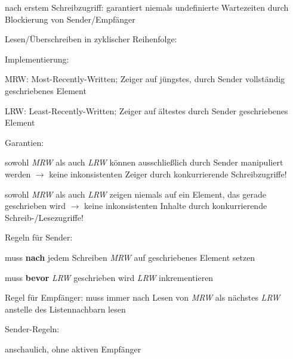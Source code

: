 \documentclass[a4paper]{article}
\begin{document}
\begin{multicols}{3}
    \begin{itemize*}
        \item
        nach erstem Schreibzugriff: garantiert niemals undefinierte
        Wartezeiten durch Blockierung von Sender/Empfänger
        \item
        Lesen/Überschreiben in zyklischer Reihenfolge:
        \item
        Implementierung:
        \begin{itemize*}
            \item MRW: Most-Recently-Written; Zeiger auf jüngstes, durch Sender vollständig geschriebenes Element
            \item LRW: Least-Recently-Written; Zeiger auf ältestes durch Sender geschriebenes Element
            \item Garantien: \begin{itemize*} \item   sowohl \emph{MRW} als auch \emph{LRW} können ausschließlich durch   Sender manipuliert werden $\rightarrow$  keine   inkonsistenten Zeiger durch konkurrierende Schreibzugriffe! \item   sowohl \emph{MRW} als auch \emph{LRW} zeigen niemals auf ein   Element, das gerade geschrieben wird $\rightarrow$    keine inkonsistenten Inhalte durch konkurrierende   Schreib-/Lesezugriffe! \end{itemize*}
            \item Regeln für Sender: \begin{itemize*} \item   muss \textbf{nach} jedem Schreiben \emph{MRW} auf geschriebenes   Element setzen \item   muss \textbf{bevor} \emph{LRW} geschrieben wird \emph{LRW}   inkrementieren \end{itemize*}
            \item Regel für Empfänger: muss immer nach Lesen von \emph{MRW} als nächstes \emph{LRW} anstelle des Listennachbarn lesen
        \end{itemize*}
        \item
        Sender-Regeln:
        \begin{itemize*}
            \item anschaulich, ohne aktiven Empfänger

\end{itemize*}
\end{itemize*}
\end{multicols}
\end{document}

